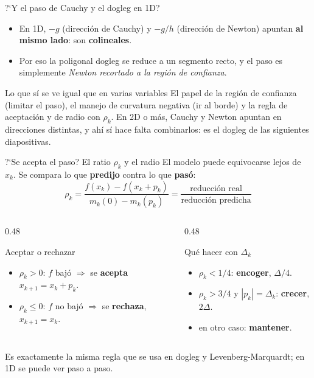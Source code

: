 \documentclass[aspectratio=169]{beamer}
\begin{document}
\begin{frame}{?`Y el paso de Cauchy y el dogleg en 1D?}
  \begin{itemize}
    \item En 1D, $-g$ (direcci\'on de Cauchy) y $-g/h$ (direcci\'on de Newton) apuntan \textbf{al mismo lado}: son \textbf{colineales}.
    \item Por eso la poligonal dogleg se reduce a un segmento recto, y el paso es simplemente \emph{Newton recortado a la regi\'on de confianza}.
  \end{itemize}
  \begin{alertblock}{Lo que s\'i se ve igual que en varias variables}
    El papel de la regi\'on de confianza (limitar el paso), el manejo de curvatura negativa (ir al borde) y la regla de aceptaci\'on y de radio con $\rho_k$. En 2D o m\'as, Cauchy y Newton apuntan en direcciones distintas, y ah\'i s\'i hace falta combinarlos: es el dogleg de las siguientes diapositivas.
  \end{alertblock}
\end{frame}

\begin{frame}{?`Se acepta el paso? El ratio $\rho_k$ y el radio}
  \small
  El modelo puede equivocarse lejos de $x_k$. Se compara lo que \textbf{predijo} contra lo que \textbf{pas\'o}:
  \[ \rho_k = \frac{f(x_k)-f(x_k+p_k)}{m_k(0)-m_k(p_k)} = \frac{\text{reducci\'on real}}{\text{reducci\'on predicha}} \]
  \begin{columns}[T]
    \begin{column}{0.48\textwidth}
      \begin{block}{Aceptar o rechazar}
        \begin{itemize}
          \item $\rho_k>0$: $f$ baj\'o $\Rightarrow$ se \textbf{acepta} $x_{k+1}=x_k+p_k$.
          \item $\rho_k\leq0$: $f$ no baj\'o $\Rightarrow$ se \textbf{rechaza}, $x_{k+1}=x_k$.
        \end{itemize}
      \end{block}
    \end{column}
    \begin{column}{0.48\textwidth}
      \begin{block}{Qu\'e hacer con $\Delta_k$}
        \begin{itemize}
          \item $\rho_k<1/4$: \textbf{encoger}, $\Delta/4$.
          \item $\rho_k>3/4$ y $|p_k|=\Delta_k$: \textbf{crecer}, $2\Delta$.
          \item en otro caso: \textbf{mantener}.
        \end{itemize}
      \end{block}
    \end{column}
  \end{columns}
  \vspace{0.2cm}
  Es exactamente la misma regla que se usa en dogleg y Levenberg-Marquardt; en 1D se puede ver paso a paso.
\end{frame}
\end{document}
